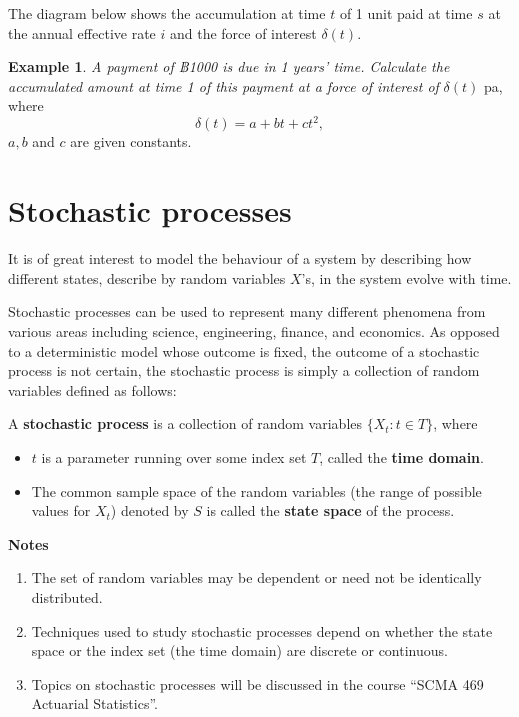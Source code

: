\documentclass[
]{book}
\theoremstyle{definition}
\theoremstyle{definition}
\newtheorem{example}{Example}[chapter]
\theoremstyle{definition}
\theoremstyle{definition}
\theoremstyle{remark}
\begin{document}
The diagram below shows the accumulation at time \(t\) of 1 unit paid at
time \(s\) at the annual effective rate \(i\) and the force of interest
\(\delta(t)\).

\begin{example}
\emph{A payment of ฿1000 is due in 1 years' time. Calculate the accumulated
amount at time 1 of this payment at a force of interest of} \(\delta(t)\)
pa, where \[\delta(t) = a + b t + c t^2,\] \(a,b\) and \(c\) are given
constants.
\end{example}

\hypertarget{stochastic-processes}{%
\section{Stochastic processes}\label{stochastic-processes}}

It is of great interest to model the behaviour of a system by describing
how different states, describe by random variables \(X\)'s, in the system
evolve with time.

Stochastic processes can be used to represent many different phenomena
from various areas including science, engineering, finance, and
economics. As opposed to a deterministic model whose outcome is fixed,
the outcome of a stochastic process is not certain, the stochastic
process is simply a collection of random variables defined as follows:

A \textbf{stochastic process} is a collection of random variables
\(\{ X_t : t \in T\}\), where

\begin{itemize}
\item
  \(t\) is a parameter running over some index set \(T\), called the
  \textbf{time domain}.
\item
  The common sample space of the random variables (the range of
  possible values for \(X_t\)) denoted by \(S\) is called the \textbf{state
  space} of the process.
\end{itemize}

\textbf{Notes}

\begin{enumerate}
\def\labelenumi{\arabic{enumi}.}
\item
  The set of random variables may be dependent or need not be
  identically distributed.
\item
  Techniques used to study stochastic processes depend on whether the
  state space or the index set (the time domain) are discrete or
  continuous.
\item
  Topics on stochastic processes will be discussed in the course ``SCMA
  469 Actuarial Statistics''.
\end{enumerate}
\end{document}
